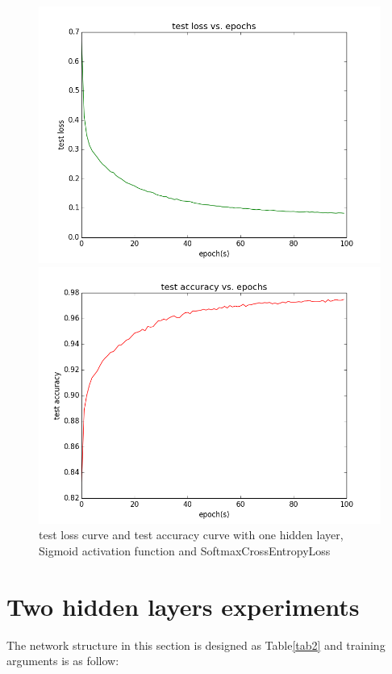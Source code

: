 \documentclass{elegantbook}
\begin{document}
\begin{figure}[!ht]
	\centering
	\begin{minipage}[t]{0.45\textwidth}
		\centering
		\includegraphics[width=\textwidth]{testloss1ss}
	\end{minipage}
	\begin{minipage}[t]{0.45\textwidth}
		\centering
		\includegraphics[width=\textwidth]{testacc1ss}
	\end{minipage}
	\caption{\label{testcurve4}test loss curve and test accuracy curve with one hidden layer, Sigmoid activation function and SoftmaxCrossEntropyLoss}
\end{figure}

\section{Two hidden layers experiments}
The network structure in this section is designed as Table\ref{tab2} and training arguments is as follow:
\end{document}
